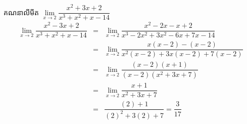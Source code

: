 \documentclass[a5paper,leqno,fleqn]{book}
\begin{document}
\begin{enumerate}
\begin{example}{}{}
	\end{example}
	\begin{example}{}{}
		គណនាលីមីត $ \lim\limits_{x\to2}\dfrac{x^2+3x+2}{x^3+x^2+x-14} $
		\begin{eqnarray*}
				\lim\limits_{x\to2}\dfrac{x^2-3x+2}{x^3+x^2+x-14}
				&=&\lim\limits_{x\to2}\dfrac{x^2-2x-x+2}{x^3-2x^2+3x^2-6x+7x-14}\\
				&=&\lim\limits_{x\to2}\dfrac{x(x-2)-(x-2)}{x^2(x-2)+3x(x-2)+7(x-2)}\\
				&=&\lim\limits_{x\to2}\dfrac{(x-2)(x+1)}{(x-2)(x^2+3x+7)}\\
				&=&\lim\limits_{x\to2}\dfrac{x+1}{x^2+3x+7}\\
				&=&\dfrac{(2)+1}{(2)^2+3(2)+7}=\dfrac{3}{17}
		\end{eqnarray*}
	\end{example}
	

\end{enumerate}
\end{document}
